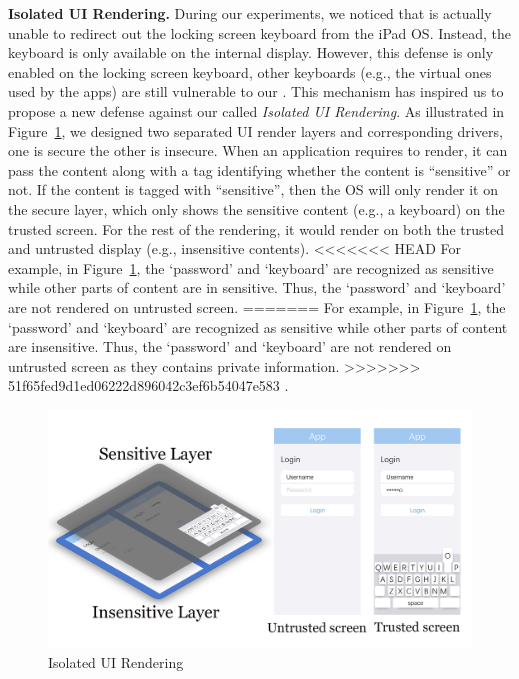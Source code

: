 \textbf{Isolated UI Rendering.} During our experiments, we noticed that \tool
is actually unable to redirect out the locking screen keyboard from the iPad
OS. Instead, the keyboard is only available on the internal display. However,
this defense is only enabled on the locking screen keyboard, other keyboards
(e.g., the virtual ones used by the apps) are still vulnerable to our \tool.
This mechanism has inspired us to propose a new defense against our \tool
called \emph{Isolated UI Rendering}. As illustrated in
Figure~\ref{fig:isolated_ui}, we designed two separated UI render layers and corresponding drivers, one
is secure the other is insecure. When an application requires to render, it can
pass the content along with a tag identifying whether the content is
``sensitive'' or not. If the content is tagged with ``sensitive'', then the OS
will only render it on the secure layer, which only shows the sensitive content
(e.g., a keyboard) on the trusted screen. For the rest of the rendering, it
would render on both the trusted and untrusted display (e.g., insensitive
contents).
<<<<<<< HEAD
For example, in Figure~\ref{fig:isolated_ui}, the `password' and `keyboard' are recognized as sensitive while other parts of content are in sensitive. Thus, the `password' and `keyboard' are not rendered on untrusted screen.
=======
For example, in Figure~\ref{fig:isolated_ui}, the `password' and `keyboard' are recognized as sensitive while other parts of content are insensitive. Thus, the `password' and `keyboard' are not rendered on untrusted screen as they contains private information.
>>>>>>> 51f65fed9d1ed06222d896042c3ef6b54047e583
 .

\begin{figure}[t]
	\centering
	\includegraphics[width=\linewidth]{./Figs/isolated_ui.png}
	\caption{Isolated UI Rendering}%
	\label{fig:isolated_ui}
\end{figure}
